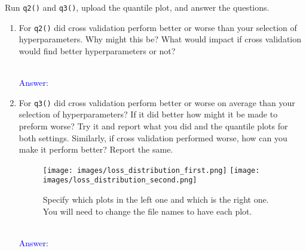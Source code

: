 \documentclass{article}
\begin{document}
\begin{enumerate}
    Run \texttt{q2()} and \texttt{q3()}, upload the quantile plot, and answer the questions. 

    \begin{enumerate}
        \item For \texttt{q2()} did cross validation perform better or worse than your selection of hyperparameters. Why might this be? What would impact if cross validation would find better hyperparameters or not? 

        \textcolor{blue}{\\Answer: }\\
        \newpage
        \item For \texttt{q3()} did cross validation perform better or worse on average than your selection of hyperparameters? If it did better how might it be made to preform worse? Try it and report what you did and the quantile plots for both settings. Similarly, if cross validation performed worse, how can you make it perform better? Report the same. 

        \begin{figure}[htbp]
            \centering
            \texttt{[image: images/loss\_distribution\_first.png]}
            \texttt{[image: images/loss\_distribution\_second.png]}
            \caption{Specify which plots in the left one and which is the right one. You will need to change the file names to have each plot.}
        \end{figure}
        \textcolor{blue}{\\Answer: }\\
    \end{enumerate}
\end{enumerate}
\end{document}

